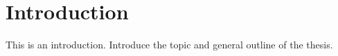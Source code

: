 \chapter{Introduction}\label{ch:introduction}

This is an introduction. Introduce the topic and general outline of the thesis.